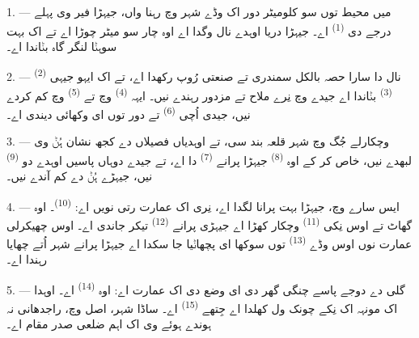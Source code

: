 
\VUsaut{2.0mm}
\VUsaut{3.0mm}
\VUfilet{16mm}
\VUsaut{5.6mm}
\VUsaut{1.4mm}
\VUsaut{2.2mm}

\VUsaut{3.0mm}

1. --- میں محیط توں سو کلومیٹر دور اک وڈے شہر وچ رہنا واں، جیہڑا فیر وی پہلے
درجے دی  \textsuperscript{(1)} اے۔ جیہڑا دریا اوہدے نال وگدا اے
اوہ چار سو میٹر چوڑا اے تے اک بہت سوہݨا لنگر گاہ بݨاندا اے۔

2. ---  \textsuperscript{(2)} نال دا سارا حصہ بالکل سمندری تے
صنعتی رُوپ رکھدا اے، تے اک ایہو جیہی  \textsuperscript{(3)}
بݨاندا اے جیدے وچ نِرے ملاح تے مزدور رہندے نیں۔ ایہہ 
\textsuperscript{(4)} وچ تے  \textsuperscript{(5)} وچ کم کردے نیں،
جیدی اُچی  \textsuperscript{(6)} تے  دور توں ای
وکھائی دیندی اے۔

3. --- وچکارلے جُگ وچ شہر قلعہ بند سی، تے اوہدیاں فصیلاں دے کجھ نشان ہُݨ وی لبھدے
نیں، خاص کر کے اوہ  \textsuperscript{(8)} جیہڑا پرانے
 \textsuperscript{(7)} دا اے، تے جیدے دوہاں پاسیں اوہدے دو
 \textsuperscript{(9)} نیں، جیہڑے ہُݨ  دے کم آندے نیں۔

4. --- ایس سارے  وچ، جیہڑا بہت پرانا لگدا اے، نِری اک عمارت رتی نویں
اے:  \textsuperscript{(10)}۔ اوہ گھاٹ تے اوس نِکی 
\textsuperscript{(11)} وچکار کھڑا اے جیہڑی پرانے 
\textsuperscript{(12)} تیکر جاندی اے۔ اوس چھیکرلی عمارت نوں اوس وڈے
 \textsuperscript{(13)} توں سوکھا ای پچھاݨیا جا سکدا اے جیہڑا
پرانے شہر اُتے چھایا رہندا اے۔

5. --- گلی دے دوجے پاسے چنگی گھر دی ای وضع دی اک عمارت  اے: اوہ
 \textsuperscript{(14)} اے۔ اوہدا اک مونہہ اک نِکے چونک ول کھلدا اے
جِتھے  \textsuperscript{(15)} اے۔ ساڈا شہر، اصل وچ، راجدھانی نہ
ہوندے ہوئے وی اک اہم ضلعی صدر مقام اے۔

